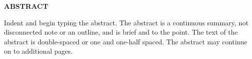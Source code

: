 {}
\thispagestyle{pgnumbottomcenter}
\begin{center}
    \textbf{ABSTRACT}
\end{center}

Indent and begin typing the abstract. The abstract is a continuous summary, not
disconnected note or an outline, and is brief and to the point. The text of the abstract is
double-spaced or one and one-half spaced. The abstract may continue on to additional
pages.
